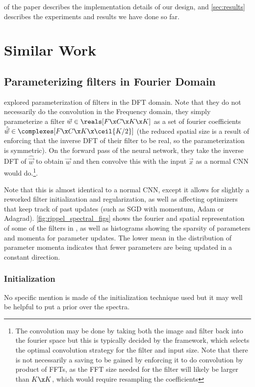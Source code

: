  of the paper describes the implementation details of our design, and
\autoref{sec:results} describes the experiments and results we have done so far.

\section{Similar Work}
\subsection{Parameterizing filters in Fourier Domain}
\cite{rippel_spectral_2015} explored parameterization of filters in the DFT
domain.  Note that they do not necessarily do the convolution in the Frequency
domain, they simply parameterize a filter $\vec{w} \in \reals[F\x C\x K\x K]$ as
a set of fourier coefficients $\hat{\vec{w}} \in \complexes[F\x C\x K \x \ceil{K/2}]$
(the reduced spatial size is a result of enforcing that the inverse DFT of their
filter to be real, so the parameterization is symmetric). On the forward pass of
the neural network, they take the inverse DFT of $\hat{\vec{w}}$ to obtain
$\vec{w}$ and then convolve this with the input $\vec{x}$ as a normal CNN
would do.\footnote{The convolution may be done by taking both the image and
filter back into the fourier space but this is typically decided by the
framework, which selects the optimal convolution strategy for the filter and
input size. Note that there is not necessarily a saving to be gained by
enforcing it to do convolution by product of FFTs, as the FFT size needed for
the filter will likely be larger than $K\x K$, which would require resampling
the coefficients}.

Note that this is almost identical to a normal CNN, except it allows for
slightly a reworked filter initialization and regularization, as well as 
affecting optimizers that keep track of past updates (such as SGD with momentum, 
Adam \cite{kingma_adam:_2014} or Adagrad). \autoref{fig:rippel_spectral_figs}
shows the fourier and spatial representation of some of the filters in
\cite{rippel_spectral_2015}, as well as histograms showing the sparsity of
parameters and momenta for parameter updates. The lower mean in the distribution
of parameter momenta indicates that fewer parameters are being updated in a
constant direction.

\subsubsection{Initialization}
No specific mention is made of the initialization technique used but it may well
be helpful to put a prior over the spectra.

